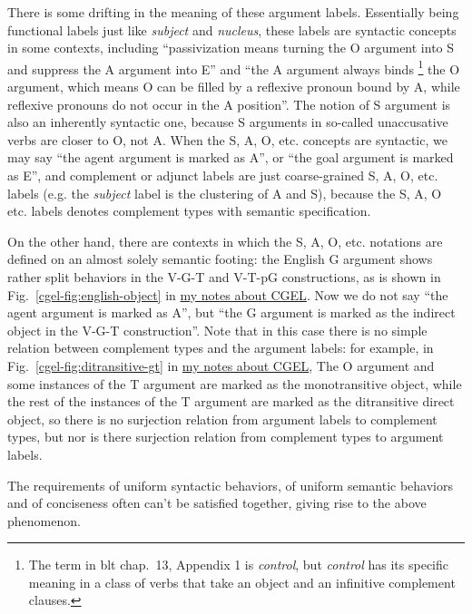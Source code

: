 \documentclass[UTF8, a4paper, oneside, scheme=plain]{ctexart}
\newcommand*{\citechap}[1]{chap.~{#1}}
\newcommand*{\citefig}[1]{Fig.~{#1}}
\newcommand*{\term}[1]{\emph{#1}}
\newcommand{\cgel}{\href{../English/cambridge.pdf}{my notes about CGEL}}
\begin{document}
There is some drifting in the meaning of these argument labels.
Essentially being functional labels just like \term{subject} and \term{nucleus},
these labels are syntactic concepts in some contexts,
including ``passivization means turning the O argument into S and suppress the A argument into E''
and ``the A argument always binds%
\footnote{
    The term in \ac{blt} \citechap{13}, Appendix 1 is \term{control},
    but \term{control} has its specific meaning in a class of verbs 
    that take an object and an infinitive complement clauses.
}
the O argument, which means O can be filled by a reflexive pronoun bound by A,
while reflexive pronouns do not occur in the A position''.
The notion of S argument is also an inherently syntactic one,
because S arguments in so-called unaccusative verbs are closer to O, not A.
When the S, A, O, etc. concepts are syntactic,
we may say ``the agent argument is marked as A'',
or ``the goal argument is marked as E'',
and complement or adjunct labels are just coarse-grained S, A, O, etc. labels
(e.g. the \term{subject} label is the clustering of A and S), 
because the S, A, O etc. labels denotes complement types with semantic specification.

On the other hand, there are contexts in which the S, A, O, etc. notations 
are defined on an almost solely semantic footing:
the English G argument shows rather split behaviors in the V-G-T and V-T-pG constructions,
as is shown in \citefig{\ref{cgel-fig:english-object}} in \cgel.
Now we do not say ``the agent argument is marked as A'',
but ``the G argument is marked as the indirect object in the V-G-T construction''.
Note that in this case there is no simple relation between complement types and the argument labels:
for example, in \citefig{\ref{cgel-fig:ditransitive-gt}} in \cgel,
The O argument and some instances of the T argument are marked as the monotransitive object,
while the rest of the instances of the T argument are marked as the ditransitive direct object,
so there is no surjection relation from argument labels to complement types,
but nor is there surjection relation from complement types to argument labels.

The requirements of uniform syntactic behaviors, 
of uniform semantic behaviors
and of conciseness
often can't be satisfied together,
giving rise to the above phenomenon.
\end{document}
